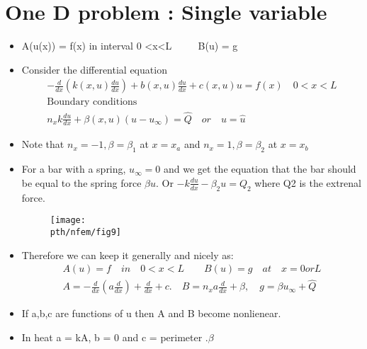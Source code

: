 \section{One D problem : Single variable}
	\begin{frame}
		\begin{itemize}
			\item A(u(x)) = f(x) in interval 0 <x<L $\qquad$ B(u) = g
			\item Consider the differential equation
			\begin{equation}
			\begin{aligned}
				-\frac{d}{dx}\left(k(x,u) \frac{du}{dx} \right) + b(x,u)\frac{du}{dx} + c(x,u)u = f(x) \quad 0<x<L \\
				\text{Boundary conditions}\\
				n_xk\frac{du}{dx} + \beta(x,u)(u-u_{\infty}) = \hat{Q}   \quad or \quad u = \hat{u}
			\end{aligned}
			\end{equation}
			\item Note that $n_x=-1, \beta = \beta_1$ at $x = x_a$ and $n_x=1, \beta = \beta_2$ at $x = x_b$
			\item For a bar with a spring, $u_{\infty} = 0$ and we get the equation that the bar should be equal to the spring force $\beta u$. Or $-k\frac{du}{dx}-\beta_2u = Q_2 $ where Q2 is the extrenal force.
			\begin{figure}
				\centering
				\texttt{[image: \\pth/nfem/fig9]} 
			\end{figure} 
		\end{itemize}
	\end{frame}


	\begin{frame}
		\begin{itemize}
			\item Therefore we can keep it generally and nicely as:
			\begin{equation}
			\begin{aligned}
				A(u) = f \quad in \quad 0<x<L \qquad B(u) = g \quad at \quad x=0 or L \\
				A = -\frac{d}{dx}\left(a \frac{d}{dx} \right) +  \frac{d}{dx} + c. \quad B = n_x a \frac{d}{dx} + \beta, \quad g = \beta u_{\infty} + \hat{Q}
			\end{aligned}
			\end{equation}
			\item If a,b,c are functions of u then A and B become nonlienear.
			\item In heat a = kA, b = 0 and c = perimeter  $. \beta$
		\end{itemize}
	\end{frame}


